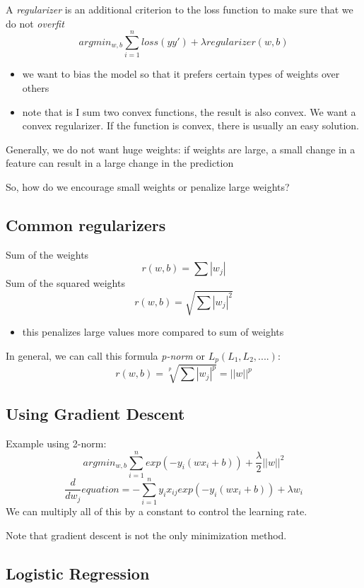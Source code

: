\documentclass{article}
\begin{document}
A \emph{regularizer} is an additional criterion to the loss function to
make sure that we do not \emph{overfit}
\[argmin_{w, b}\sum_{i=1}^nloss(yy')+\lambda regularizer(w, b)\]

\begin{itemize}
\tightlist
\item
  we want to bias the model so that it prefers certain types of weights
  over others
\item
  note that is I sum two convex functions, the result is also convex. We
  want a convex regularizer. If the function is convex, there is usually
  an easy solution.
\end{itemize}

Generally, we do not want huge weights: if weights are large, a small
change in a feature can result in a large change in the prediction

So, how do we encourage small weights or penalize large weights?

\subsection{Common regularizers}\label{common-regularizers}

Sum of the weights \[r(w, b)=\sum |w_j|\] Sum of the squared weights
\[r(w, b)=\sqrt{\sum |w_j|^2}\]

\begin{itemize}
\tightlist
\item
  this penalizes large values more compared to sum of weights
\end{itemize}

In general, we can call this formula \emph{p-norm} or
\(L_p (L_1, L_2, ....)\): \[r(w, b)=\sqrt[p]{\sum |w_j|^p}=||w||^p\]

\subsection{Using Gradient Descent}\label{using-gradient-descent}

Example using 2-norm:
\[argmin_{w, b}\sum_{i=1}^n exp(-y_i(wx_i+b))+\frac{\lambda}{2}||w||^2\]
\[\frac{d}{dw_j}equation = -\sum_{i=1}^n y_ix_{ij}exp(-y_i(wx_i+b))+\lambda w_i\]
We can multiply all of this by a constant to control the learning rate.

Note that gradient descent is not the only minimization method.

\subsection{Logistic Regression}\label{logistic-regression}
\end{document}
